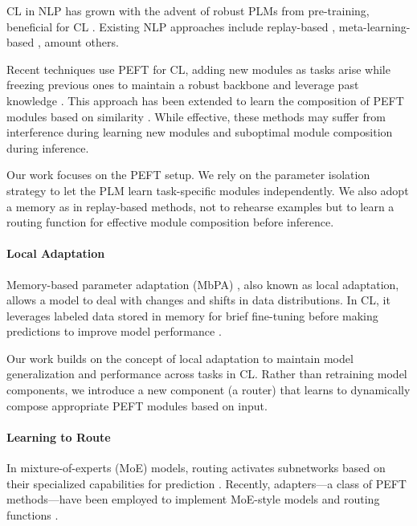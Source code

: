 \documentclass[11pt]{article}
\begin{document}
CL in NLP has grown with the advent of robust PLMs from pre-training, beneficial for CL \cite{zhou2024continual}. Existing NLP approaches include replay-based \citep{NEURIPS2019_f8d2e80c,Araujo_2022_CVPR}, meta-learning-based \citep{wang-etal-2020-efficient}, amount others.

Recent techniques use PEFT for CL, adding new modules as tasks arise while freezing previous ones to maintain a robust backbone and leverage past knowledge \cite{razdaibiedina2023progressive}. This approach has been extended to learn the composition of PEFT modules based on similarity \cite{wang2024rehearsalfree}. While effective, these methods may suffer from interference during learning new modules and suboptimal module composition during inference.

Our work focuses on the PEFT setup. We rely on the parameter isolation strategy \cite{wang-etal-2023-rehearsal,cheng2024dynamic} to let the PLM learn task-specific modules independently. 
We also adopt a memory as in replay-based methods, not to rehearse examples but to learn a routing function for effective module composition before inference.

\paragraph{Local Adaptation}

Memory-based parameter adaptation (MbPA) \cite{sprechmann2018memorybased}, also known as local adaptation, allows a model to deal with changes and shifts in data distributions. In CL, it leverages labeled data stored in memory for brief fine-tuning before making predictions to improve model performance \cite{NEURIPS2019_f8d2e80c}.

Our work builds on the concept of local adaptation to maintain model generalization and performance across tasks in CL. Rather than retraining model components, we introduce a new component (a router) that learns to dynamically compose appropriate PEFT modules based on input.

\paragraph{Learning to Route}

In mixture-of-experts (MoE) models, routing activates subnetworks based on their specialized capabilities for prediction \cite{shazeer2017}. Recently, adapters—a class of PEFT methods—have been employed to implement MoE-style models \cite{wang-etal-2022-adamix} and routing functions \cite{ponti-etal-2023-combining}.
\end{document}
